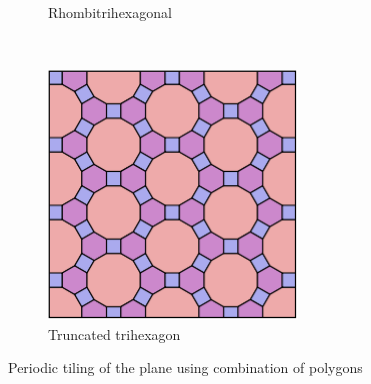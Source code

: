 \documentclass[]{article}
\begin{document}
\begin{figure}
\begin{subfigure}[hb]{0.3\textwidth}
                \caption{Rhombitrihexagonal}
                \label{fig:rhombitri}
        \end{subfigure}
        ~ %
        \begin{subfigure}[hb]{0.3\textwidth}
                \includegraphics[width=\textwidth]{truncatedtrihexagon}
                \caption{Truncated trihexagon \textbf{}}
                \label{fig:trunctrihexagon}
        \end{subfigure}
        \caption{Periodic tiling of the plane using combination of polygons}\label{fig:combo}
\end{figure}
\end{document}

